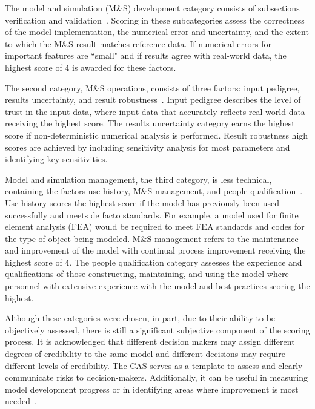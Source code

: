 \documentclass[12pt]{report}
\begin{document}
The model and simulation (M\&S) development category consists of subsections verification and validation~\cite{babula_nasa_2009}. Scoring in these subcategories assess the correctness of the model implementation, the numerical error and uncertainty, and the extent to which the M\&S result matches reference data. If numerical errors for important features are ``small" and if results agree with real-world data, the highest score of 4 is awarded for these factors.

The second category, M\&S operations, consists of three factors: input pedigree, results uncertainty, and result robustness~\cite{babula_nasa_2009}. Input pedigree describes the level of trust in the input data, where input data that accurately reflects real-world data receiving the highest score. The results uncertainty category earns the highest score if non-deterministic numerical analysis is performed. Result robustness high scores are achieved by including sensitivity analysis for most parameters and identifying key sensitivities.

Model and simulation management, the third category, is less technical, containing the factors use history, M\&S management, and people qualification~\cite{babula_nasa_2009}. Use history scores the highest score if the model has previously been used successfully and meets de facto standards. For example, a model used for finite element analysis (FEA) would be required to meet FEA standards and codes for the type of object being modeled. M\&S management refers to the maintenance and improvement of the model with continual process improvement receiving the highest score of 4.  The people qualification category assesses the experience and qualifications of those constructing, maintaining, and using the model where personnel with extensive experience with the model and best practices scoring the highest. 

Although these categories were chosen, in part, due to their ability to be objectively assessed, there is still a significant subjective component of the scoring process. It is acknowledged that different decision makers may assign different degrees of credibility to the same model and different decisions may require different levels of credibility. The CAS serves as a template to assess and clearly communicate risks to decision-makers. Additionally, it can be useful in measuring model development progress or in identifying areas where improvement is most needed~\cite{Blattnig2013-qx}.
\end{document}
